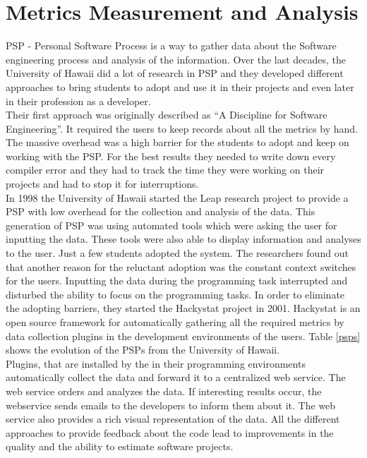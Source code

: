 \section{Metrics Measurement and Analysis}
PSP - Personal Software Process is a way to gather data about the Software engineering process and analysis of the information.
Over the last decades, the University of Hawaii did a lot of research in PSP and they developed different approaches to bring students to adopt and use it in their projects and even later in their profession as a developer.\\
Their first approach was originally described as ``A Discipline for Software Engineering''. It required the users to keep records about all the metrics by hand. The massive overhead was a high barrier for the students to adopt and keep on working with the PSP. For the best results they needed to write down every compiler error and they had to track the time they were working on their projects and had to stop it for interruptions.\\
In 1998 the University of Hawaii started the Leap research project to provide a PSP with low overhead for the collection and analysis of the data. This generation of PSP was using automated tools which were asking the user for inputting the data. These tools were also able to display information and analyses to the user.
Just a few students adopted the system. The researchers found out that another reason for the reluctant adoption was the constant context switches for the users. Inputting the data during the programming task interrupted and disturbed the ability to focus on the programming tasks. \cite{johnson2003beyond}
In order to eliminate the adopting barriers, they started the Hackystat project in 2001. Hackystat is an open source framework for automatically gathering all the required metrics by data collection plugins in the development environments of the users. Table \ref{psps} shows the evolution of the PSPs from the University of Hawaii.\\
Plugins, that are installed by the in their programming environments automatically collect the data and forward it to a centralized web service. The web service orders and analyzes the data. If interesting results occur, the webservice sends emails to the developers to inform them about it. The web service also provides a rich visual representation of the data.
All the different approaches to provide feedback about the code lead to improvements in the quality and the ability to estimate software projects. \cite{johnson2001project} 
